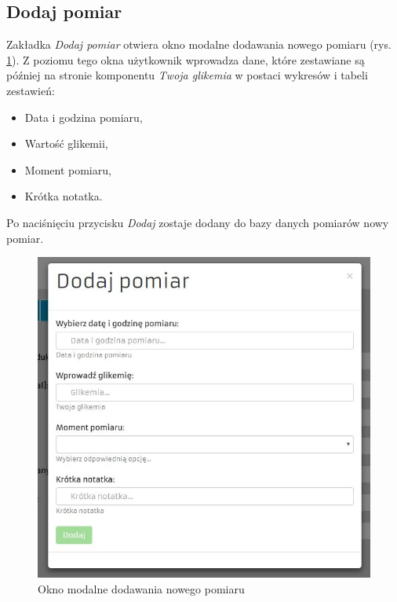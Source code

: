 \newpage

\subsection{Dodaj pomiar}
Zakładka \textit{Dodaj pomiar} otwiera okno modalne dodawania nowego pomiaru (rys. \ref{Rys:measurement}). Z poziomu tego okna użytkownik wprowadza dane, które zestawiane są później na stronie komponentu \textit{Twoja glikemia} w postaci wykresów i tabeli zestawień:

\begin{itemize}
	\item Data i godzina pomiaru,
	\item Wartość glikemii,
	\item Moment pomiaru,
	\item Krótka notatka.
\end{itemize}
Po naciśnięciu przycisku \textit{Dodaj} zostaje dodany do bazy danych pomiarów nowy pomiar.  

\begin{figure}[h]
	\centering\includegraphics[scale=0.5]{images/measurement.jpg}
	\caption{Okno modalne dodawania nowego pomiaru}
	\label{Rys:measurement}
\end{figure}

